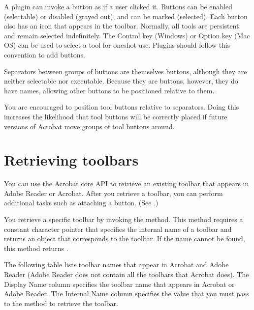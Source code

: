 \documentclass[letterpaper,12pt,english,openany,oneside]{sphinxmanual}
\begin{document}
A plugin can invoke a button as if a user clicked it. Buttons can be enabled (selectable) or disabled (grayed out), and can be marked (selected). Each button also has an icon that appears in the toolbar. Normally, all tools are persistent and remain selected indefinitely. The Control key (Windows) or Option key (Mac OS) can be used to select a tool for one\sphinxhyphen{}shot use. Plugins should follow this convention to add buttons.

Separators between groups of buttons are themselves buttons, although they are neither selectable nor executable. Because they are buttons, however, they do have names, allowing other buttons to be positioned relative to them.

You are encouraged to position tool buttons relative to separators. Doing this increases the likelihood that tool buttons will be correctly placed if future versions of Acrobat move groups of tool buttons around.


\section{Retrieving toolbars}
\label{\detokenize{Plugins_Toolbutton:retrieving-toolbars}}
You can use the Acrobat core API to retrieve an existing toolbar that appears in Adobe Reader or Acrobat. After you retrieve a toolbar, you can perform additional tasks such as attaching a button. (See .)

You retrieve a specific toolbar by invoking the  method. This method requires a constant character pointer that specifies the internal name of a toolbar and returns an  object that corresponds to the toolbar. If the name cannot be found, this method returns .

The following table lists toolbar names that appear in Acrobat and Adobe Reader (Adobe Reader does not contain all the toolbars that Acrobat does). The Display Name column specifies the toolbar name that appears in Acrobat or Adobe Reader. The Internal Name column specifies the value that you must pass to the  method to retrieve the toolbar.
\end{document}
